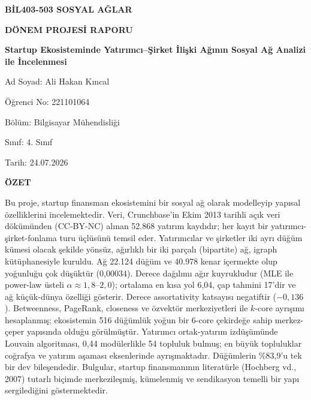 \documentclass[12pt,a4paper]{article}
\begin{document}
\begin{titlepage}
\centering
\vspace*{0.3cm}
{\LARGE\bfseries BİL403-503 SOSYAL AĞLAR\par}
\vspace{0.4cm}
{\LARGE\bfseries DÖNEM PROJESİ RAPORU\par}
\vspace{0.8cm}
{\Large\bfseries Startup Ekosisteminde Yatırımcı--Şirket İlişki Ağının Sosyal Ağ Analizi ile İncelenmesi\par}
\vspace{1.0cm}
{\large Ad Soyad: Ali Hakan Kıncal\par}
\vspace{0.15cm}
{\large Öğrenci No: 221101064\par}
\vspace{0.15cm}
{\large Bölüm: Bilgisayar Mühendisliği\par}
\vspace{0.15cm}
{\large Sınıf: 4. Sınıf\par}
\vspace{0.15cm}
{\large Tarih: 24.07.2026\par}
\vspace{0.9cm}
{\Large\bfseries ÖZET\par}
\vspace{0.35cm}
\begin{minipage}{0.92\textwidth}
\onehalfspacing
Bu proje, startup finansman ekosistemini bir sosyal ağ olarak modelleyip yapısal özelliklerini incelemektedir. Veri, Crunchbase'in Ekim 2013 tarihli açık veri dökümünden (CC-BY-NC) alınan 52.868 yatırım kaydıdır; her kayıt bir yatırımcı-şirket-fonlama turu üçlüsünü temsil eder. Yatırımcılar ve şirketler iki ayrı düğüm kümesi olacak şekilde yönsüz, ağırlıklı bir iki parçalı (bipartite) ağ, igraph kütüphanesiyle kuruldu. Ağ 22.124 düğüm ve 40.978 kenar içermekte olup yoğunluğu çok düşüktür (0,00034). Derece dağılımı ağır kuyrukludur (MLE ile power-law üsteli $\alpha \approx 1{,}8$--$2{,}0$); ortalama en kısa yol 6,04, çap tahmini 17'dir ve ağ küçük-dünya özelliği gösterir. Derece assortativity katsayısı negatiftir ($-0{,}136$). Betweenness, PageRank, closeness ve özvektör merkeziyetleri ile $k$-core ayrışımı hesaplanmış; ekosistemin 516 düğümlük yoğun bir 6-core çekirdeğe sahip merkez-çeper yapısında olduğu görülmüştür. Yatırımcı ortak-yatırım izdüşümünde Louvain algoritması, 0,44 modülerlikle 54 topluluk bulmuş; en büyük topluluklar coğrafya ve yatırım aşaması eksenlerinde ayrışmaktadır. Düğümlerin \%83,9'u tek bir dev bileşendedir. Bulgular, startup finansmanının literatürle (Hochberg vd., 2007) tutarlı biçimde merkezileşmiş, kümelenmiş ve sendikasyon temelli bir yapı sergilediğini göstermektedir.
\end{minipage}
\end{titlepage}
\end{document}
